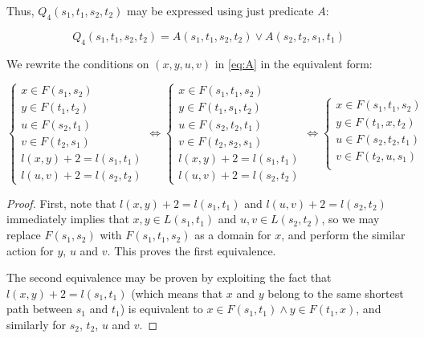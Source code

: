 Thus, $Q_4(s_1, t_1, s_2, t_2)$ may be expressed using just predicate $A$:

\begin{equation} \label{eq:Q4A}
Q_4(s_1, t_1, s_2, t_2) = A(s_1, t_1, s_2, t_2) \vee A(s_2, t_2, s_1, t_1)
\end{equation}

We rewrite the conditions on $(x, y, u, v)$ in \eqref{eq:A} in the equivalent form:

\begin{proposition}

\begin{equation}
\begin{cases}
    x \in F(s_1, s_2)\\ 
    y \in F(t_1, t_2)\\ 
    u \in F(s_2, t_1)\\ 
    v \in F(t_2, s_1)\\ 
    l(x, y) + 2 = l(s_1, t_1)\\ 
    l(u, v) + 2 = l(s_2, t_2)
\end{cases} \Longleftrightarrow
\begin{cases}
    x \in F(s_1, t_1, s_2)\\ 
    y \in F(t_1, s_1, t_2)\\ 
    u \in F(s_2, t_2, t_1)\\ 
    v \in F(t_2, s_2, s_1)\\ 
    l(x, y) + 2 = l(s_1, t_1)\\ 
    l(u, v) + 2 = l(s_2, t_2)
\end{cases} \Longleftrightarrow
\begin{cases}
    x \in F(s_1, t_1, s_2)\\ 
    y \in F(t_1, x, t_2)\\ 
    u \in F(s_2, t_2, t_1)\\ 
    v \in F(t_2, u, s_1)\\ 
\end{cases}
\end{equation}
\end{proposition}
\begin{proof}

First, note that $l(x, y) + 2 = l(s_1, t_1)$ and $l(u, v) + 2 = l(s_2, t_2)$ immediately implies that $x, y \in L(s_1, t_1)$ and $u, v \in L(s_2, t_2)$, so we may replace $F(s_1, s_2)$ with $F(s_1, t_1, s_2)$ as a domain for $x$, and perform the similar action for $y$, $u$ and $v$. This proves the first equivalence.

The second equivalence may be proven by exploiting the fact that $l(x, y) + 2 = l(s_1, t_1)$ (which means that $x$ and $y$ belong to the same shortest path between $s_1$ and $t_1$) is equivalent to $x \in F(s_1, t_1) \wedge y \in F(t_1, x)$, and similarly for $s_2$, $t_2$, $u$ and $v$. 
\end{proof}

